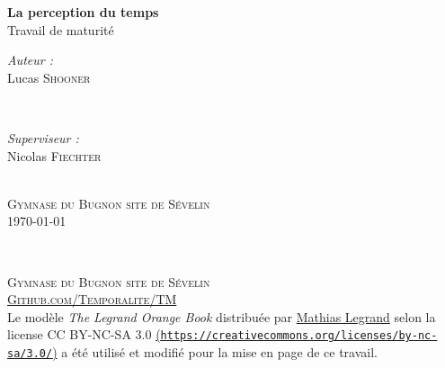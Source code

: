 \documentclass[12pt,fleqn,oneside]{book} %
\begin{document}

\begingroup
\thispagestyle{empty}
\centering
\vspace*{6,8cm}
\par\normalfont\fontsize{35}{35}\sffamily\selectfont

\textbf{La perception du temps}\\
{\LARGE Travail de maturité}\par %
\vspace*{0,8cm}
\begin{minipage}{0.445\textwidth}
	\begin{flushleft} \large
		\emph{Auteur :}\\
		{\Large Lucas \textsc{Shooner}} %
	\end{flushleft}
\end{minipage}
~
\begin{minipage}{0.445\textwidth}
	\begin{flushright} \large
		\emph{Superviseur :} \\
		{\Large Nicolas \textsc{Fiechter}} %
	\end{flushright}
\end{minipage} \\ 
{{\large \textsc{Gymnase du Bugnon site de Sévelin}}} \\
{\large \today}\\ \par
\endgroup


\newpage
~\vfill
\thispagestyle{empty}

\noindent \textsc{Gymnase du Bugnon site de Sévelin}\\

\noindent \textsc{\href{http://github.com/Temporalite/TM}{Github.com/Temporalite/TM}}\\ %

\noindent Le modèle \emph{The Legrand Orange Book} distribuée par \href{legrand.mathias@gmail.com}{Mathias Legrand}
 selon la license CC BY-NC-SA 3.0 \href{https://creativecommons.org/licenses/by-nc-sa/3.0/}{ (\texttt{https://creativecommons.org/licenses/by-nc-sa/3.0/})} a été utilisé et modifié pour la mise en page de ce travail. \\ %
\end{document}
